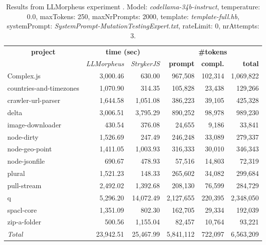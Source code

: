 
\begin{table*}[hbt!]
\centering
{\scriptsize
\begin{tabular}{l||r|r|r|r|r}
\multicolumn{1}{c|}{\bf project} & \multicolumn{2}{|c|}{\bf time (sec)} & \multicolumn{3}{|c|}{\bf \#tokens} \\
               & {\it LLMorpheus} & {\it StrykerJS} & {\bf prompt} & {\bf compl.} & {\bf total} \\
\hline
  Complex.js & 3,000.46 & 630.00 & 967,508 & 102,314 & 1,069,822 \\ 
countries-and-timezones & 1,070.90 & 314.35 & 105,828 & 23,438 & 129,266 \\ 
crawler-url-parser & 1,644.58 & 1,051.08 & 386,223 & 39,105 & 425,328 \\ 
delta & 3,006.51 & 3,795.29 & 890,252 & 98,978 & 989,230 \\ 
image-downloader & 430.54 & 376.08 & 24,655 & 9,186 & 33,841 \\ 
node-dirty & 1,526.69 & 247.49 & 246,248 & 33,089 & 279,337 \\ 
node-geo-point & 1,411.05 & 1,003.93 & 316,333 & 30,010 & 346,343 \\ 
node-jsonfile & 690.67 & 478.93 & 57,516 & 14,803 & 72,319 \\ 
plural & 1,521.23 & 148.33 & 265,602 & 34,082 & 299,684 \\ 
pull-stream & 2,492.02 & 1,392.68 & 208,130 & 76,599 & 284,729 \\ 
q & 5,296.20 & 14,072.49 & 2,127,655 & 220,395 & 2,348,050 \\ 
spacl-core & 1,351.09 & 802.30 & 162,705 & 29,334 & 192,039 \\ 
zip-a-folder & 500.56 & 1,155.04 & 82,457 & 10,764 & 93,221 \\ 
\hline
  \textit{Total} & 23,942.51 & 25,467.99 & 5,841,112 & 722,097 & 6,563,209 \\
  \end{tabular}
  }
  \\[2mm]
  \caption{Results from LLMorpheus experiment .
    Model: \textit{codellama-34b-instruct}, 
    temperature: 0.0, 
    maxTokens: 250, 
    maxNrPrompts: 2000, 
    template: \textit{template-full.hb}, 
    systemPrompt: \textit{SystemPrompt-MutationTestingExpert.txt}, 
    rateLimit: 0, 
    nrAttempts: 3.  
  }
  \label{table:Cost:run315:codellama-34b-instruct:template-full.hb:0.0}
\end{table*}